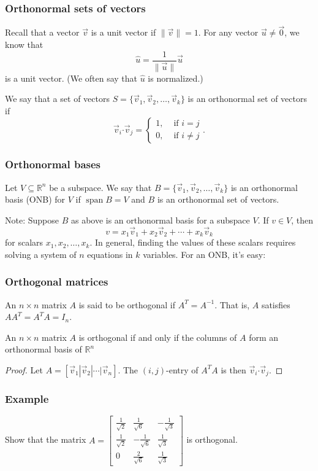 \documentclass[11pt,t]{beamer}
\DeclareMathOperator{\spn}{span}
\newcommand{\R}{\mathbb{R}}
\newcommand{\len}[1]{\lVert #1\rVert}
\newcommand{\dotp}{\boldsymbol{\cdot}}
\begin{document}
\begin{frame}\frametitle{Orthonormal sets of vectors}
 Recall that a vector $\vec{v}$ is a \alert{unit vector} if $\len{\vec{v}}=1$. For any vector $\vec{u}\neq\vec{0}$, we know that
\[
 \hat{u}=\frac{1}{\len{\vec{u}}}\vec{u}
\]
is a unit vector. (We often say that $\hat{u}$ is \alert{normalized}.) 
\begin{definition}
 We say that a set of vectors $S=\{\vec{v}_1,\vec{v}_2,\ldots, \vec{v}_k\}$ is an \alert{orthonormal set of vectors} if
\[
 \vec{v}_i\dotp \vec{v}_j = \begin{cases} 1, & \text{ if } i=j\\0, & \text{ if } i\neq j\end{cases}.
\]

\end{definition}

\end{frame}
\begin{frame}\frametitle{Orthonormal bases}
\begin{definition}
 Let $V\subseteq \R^n$ be a subspace. We say that $B=\{\vec{v}_1,\vec{v}_2,\ldots, \vec{v}_k\}$ is an \alert{orthonormal basis} (ONB) for $V$ if $\spn B=V$ and $B$ is an orthonormal set of vectors.
\end{definition}
\alert{Note:} Suppose $B$ as above is an orthonormal basis for a subspace $V$. If $v\in V$, then
\[
 v = x_1\vec{v}_1+x_2\vec{v}_2+\cdots + x_k\vec{v}_k
\]
for scalars $x_1,x_2,\ldots, x_k$. In general, finding the values of these scalars requires solving a system of $n$ equations in $k$ variables. For an ONB, it's easy:
 
\end{frame}
\begin{frame}\frametitle{Orthogonal matrices}
 \begin{definition}
  An $n\times n$ matrix $A$ is said to be \alert{orthogonal} if $A^T=A^{-1}$. That is, $A$ satisfies $AA^T=A^TA = I_n$.
 \end{definition}
\begin{theorem}
 An $n\times n$ matrix $A$ is orthogonal if and only if the columns of $A$ form an orthonormal basis of $\R^n$
\end{theorem}
\begin{proof}
 Let $A=[\vec{v}_1|\vec{v}_2|\cdots |\vec{v}_n]$. The $(i,j)$-entry of $A^TA$ is then $\vec{v}_i\dotp\vec{v}_j$.
\end{proof}

\end{frame}
\begin{frame}\frametitle{Example}
 Show that the matrix $A = \begin{bmatrix}\frac{1}{\sqrt{2}}&\frac{1}{\sqrt{6}}&-\frac{1}{\sqrt{3}}\\\frac{1}{\sqrt{2}}&-\frac{1}{\sqrt{6}}&\frac{1}{\sqrt{3}}\\0&\frac{2}{\sqrt{6}}&\frac{1}{\sqrt{3}}\end{bmatrix}$ is orthogonal.
\end{frame}
\end{document}
